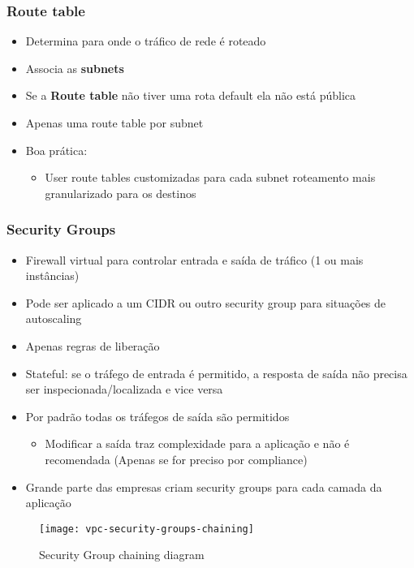 \begin{frame}
	\frametitle{Route table}
	\begin{itemize}
		\item Determina para onde o tráfico de rede é roteado
		\item Associa as \textbf{subnets}
		\item Se a \textbf{Route table} não tiver uma rota default ela não está pública
		\item Apenas uma route table por subnet
		\item Boa prática:
			\begin{itemize}
				\item User route tables customizadas para cada subnet roteamento mais granularizado para os destinos
			\end{itemize}
	\end{itemize}
\end{frame}

\begin{frame}[allowframebreaks]
	\frametitle{Security Groups}
	\begin{itemize}
		\item Firewall virtual para controlar entrada e saída de tráfico (1 ou mais instâncias)
		\item Pode ser aplicado a um CIDR ou outro security group para situações de autoscaling
		\item Apenas regras de liberação
		\item Stateful: se o tráfego de entrada é permitido, a resposta de saída não precisa ser inspecionada/localizada e vice versa
		\item Por padrão todas os tráfegos de saída são permitidos
			\begin{itemize}
				\item Modificar a saída traz complexidade para a aplicação e não é recomendada (Apenas se for preciso por compliance)
			\end{itemize}
		\framebreak
		\item Grande parte das empresas criam security groups para cada camada da aplicação

	\end{itemize}
	\begin{figure}[htpb]
		\centering
			\texttt{[image: vpc-security-groups-chaining]}
		\caption{Security Group chaining diagram}
	\end{figure}
\end{frame}

